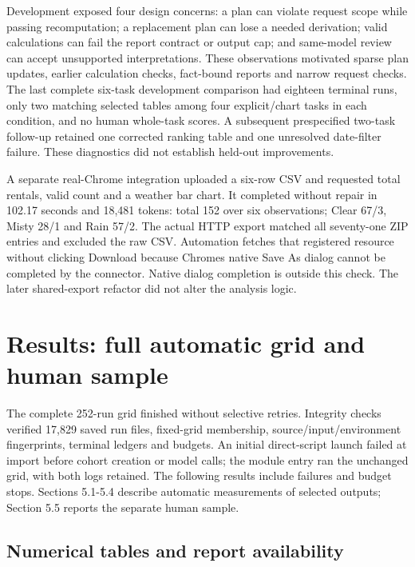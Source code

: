 Development exposed four design concerns: a plan can violate request scope while passing recomputation; a replacement plan can lose a needed derivation; valid calculations can fail the report contract or output cap; and same-model review can accept unsupported interpretations. These observations motivated sparse plan updates, earlier calculation checks, fact-bound reports and narrow request checks. The last complete six-task development comparison had eighteen terminal runs, only two matching selected tables among four explicit/chart tasks in each condition, and no human whole-task scores. A subsequent prespecified two-task follow-up retained one corrected ranking table and one unresolved date-filter failure. These diagnostics did not establish held-out improvements.

A separate real-Chrome integration uploaded a six-row CSV and requested total rentals, valid count and a weather bar chart. It completed without repair in 102.17 seconds and 18,481 tokens: total 152 over six observations; Clear 67/3, Misty 28/1 and Rain 57/2. The actual HTTP export matched all seventy-one ZIP entries and excluded the raw CSV. Automation fetches that registered resource without clicking Download because Chrome\textquotesingle s native Save As dialog cannot be completed by the connector. Native dialog completion is outside this check. The later shared-export refactor did not alter the analysis logic.

\section{Results: full automatic grid and human sample}\label{results-full-automatic-grid-and-human-sample}

The complete 252-run grid finished without selective retries. Integrity checks verified 17,829 saved run files, fixed-grid membership, source/input/environment fingerprints, terminal ledgers and budgets. An initial direct-script launch failed at import before cohort creation or model calls; the module entry ran the unchanged grid, with both logs retained. The following results include failures and budget stops. Sections 5.1-5.4 describe automatic measurements of selected outputs; Section 5.5 reports the separate human sample.

\subsection{Numerical tables and report availability}\label{numerical-tables-and-report-availability}

